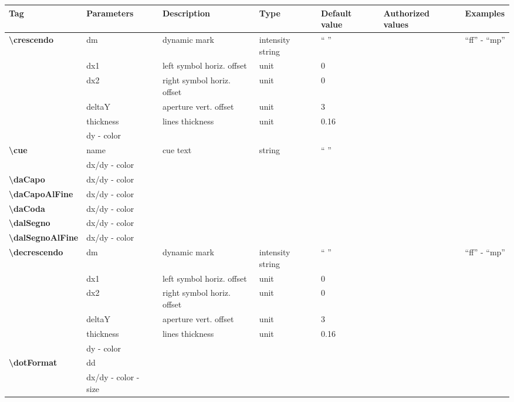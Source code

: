 \documentclass[a4paper, landscape, 10pt]{article}
\begin{document}
\begin{tabularx}{\linewidth}{p{3cm}p{3cm}p{5cm}p{3cm}p{2.5cm}p{3.5cm}p{4cm}}
    \hline
    \textbf{Tag}&\textbf{Parameters}&\textbf{Description}&\textbf{Type}&\textbf{Default value}&\textbf{Authorized values}&\textbf{Examples}\\
    \hline
    \textbf{\textbackslash{}crescendo}&dm&dynamic mark&intensity string&`` ''&&``ff'' - ``mp''\\
    &dx1&left symbol horiz. offset&unit&0&&\\
    &dx2&right symbol horiz. offset&unit&0&&\\
    &deltaY&aperture vert. offset&unit&3&&\\
    &thickness&lines thickness&unit&0.16&&\\
	&dy - color&&&&&\\
    \hline
    \textbf{\textbackslash{}cue}&name&cue text&string&`` ''&&\\
    &dx/dy - color&&&&&\\
    \hline
    \textbf{\textbackslash{}daCapo}&dx/dy - color&&&&&\\
    \hline
    \textbf{\textbackslash{}daCapoAlFine}&dx/dy - color&&&&&\\
    \hline
    \textbf{\textbackslash{}daCoda}&dx/dy - color&&&&&\\
    \hline
    \textbf{\textbackslash{}dalSegno}&dx/dy - color&&&&&\\
    \hline
    \textbf{\textbackslash{}dalSegnoAlFine}&dx/dy - color&&&&&\\
    \hline
    \textbf{\textbackslash{}decrescendo}&dm&dynamic mark&intensity string&`` ''&&``ff'' - ``mp''\\
    &dx1&left symbol horiz. offset&unit&0&&\\
    &dx2&right symbol horiz. offset&unit&0&&\\
    &deltaY&aperture vert. offset&unit&3&&\\
    &thickness&lines thickness&unit&0.16&&\\
    &dy - color&&&&&\\
    \hline    
    \textbf{\textbackslash{}dotFormat}&dd&&&&&\\ %
    &dx/dy - color - size&&&&&\\

\end{tabularx}
\end{document}
